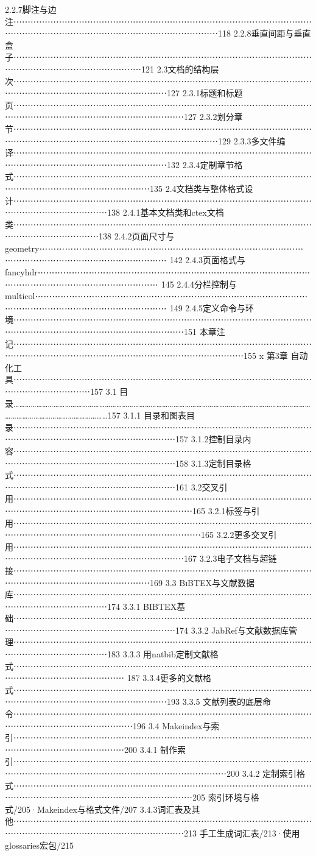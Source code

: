 \documentclass[UTF8]{ctexart}
\begin{document}
2.2.7脚注与边注⋯⋯⋯⋯⋯⋯⋯⋯⋯⋯⋯⋯⋯⋯⋯⋯⋯⋯⋯⋯⋯⋯⋯⋯⋯⋯⋯⋯⋯⋯⋯⋯⋯⋯⋯⋯⋯⋯⋯⋯⋯⋯⋯⋯⋯⋯⋯⋯⋯⋯⋯⋯⋯⋯⋯⋯⋯⋯⋯⋯118
2.2.8垂直间距与垂直盒子⋯⋯⋯⋯⋯⋯⋯⋯⋯⋯⋯⋯⋯⋯⋯⋯⋯⋯⋯⋯⋯⋯⋯⋯⋯⋯⋯⋯⋯⋯⋯⋯⋯⋯⋯⋯⋯⋯⋯⋯⋯⋯⋯⋯⋯⋯⋯⋯⋯⋯⋯121
2.3文档的结构层次⋯⋯⋯⋯⋯⋯⋯⋯⋯⋯⋯⋯⋯⋯⋯⋯⋯⋯⋯⋯⋯⋯⋯⋯⋯⋯⋯⋯⋯⋯⋯⋯⋯⋯⋯⋯⋯⋯⋯⋯⋯⋯⋯⋯⋯⋯⋯⋯⋯⋯⋯⋯⋯⋯127
2.3.1标题和标题页⋯⋯⋯⋯⋯⋯⋯⋯⋯⋯⋯⋯⋯⋯⋯⋯⋯⋯⋯⋯⋯⋯⋯⋯⋯⋯⋯⋯⋯⋯⋯⋯⋯⋯⋯⋯⋯⋯⋯⋯⋯⋯⋯⋯⋯⋯⋯⋯⋯⋯⋯⋯⋯⋯⋯⋯127
2.3.2划分章节⋯⋯⋯⋯⋯⋯⋯⋯⋯⋯⋯⋯⋯⋯⋯⋯⋯⋯⋯⋯⋯⋯⋯⋯⋯⋯⋯⋯⋯⋯⋯⋯⋯⋯⋯⋯⋯⋯⋯⋯⋯⋯⋯⋯⋯⋯⋯⋯⋯⋯⋯⋯⋯⋯⋯⋯⋯⋯⋯⋯129
2.3.3多文件编译⋯⋯⋯⋯⋯⋯⋯⋯⋯⋯⋯⋯⋯⋯⋯⋯⋯⋯⋯⋯⋯⋯⋯⋯⋯⋯⋯⋯⋯⋯⋯⋯⋯⋯⋯⋯⋯⋯⋯⋯⋯⋯⋯⋯⋯⋯⋯⋯⋯⋯⋯⋯⋯⋯132
2.3.4定制章节格式⋯⋯⋯⋯⋯⋯⋯⋯⋯⋯⋯⋯⋯⋯⋯⋯⋯⋯⋯⋯⋯⋯⋯⋯⋯⋯⋯⋯⋯⋯⋯⋯⋯⋯⋯⋯⋯⋯⋯⋯⋯⋯⋯⋯⋯⋯⋯⋯⋯⋯⋯⋯135
2.4文档类与整体格式设计⋯⋯⋯⋯⋯⋯⋯⋯⋯⋯⋯⋯⋯⋯⋯⋯⋯⋯⋯⋯⋯⋯⋯⋯⋯⋯⋯⋯⋯⋯⋯⋯⋯⋯⋯⋯⋯⋯⋯⋯⋯⋯⋯⋯⋯⋯⋯138
2.4.1基本文档类和ctex文档类⋯⋯⋯⋯⋯⋯⋯⋯⋯⋯⋯⋯⋯⋯⋯⋯⋯⋯⋯⋯⋯⋯⋯⋯⋯⋯⋯⋯⋯⋯⋯⋯⋯⋯⋯⋯⋯⋯⋯⋯⋯⋯⋯⋯⋯⋯138
2.4.2页面尺寸与geometry⋯⋯⋯⋯⋯⋯⋯⋯⋯⋯⋯⋯⋯⋯⋯⋯⋯⋯⋯⋯⋯⋯⋯⋯⋯⋯⋯⋯⋯⋯⋯⋯⋯⋯⋯⋯⋯⋯⋯⋯⋯⋯⋯⋯⋯⋯⋯⋯⋯⋯ 142
2.4.3页面格式与fancyhdr⋯⋯⋯⋯⋯⋯⋯⋯⋯⋯⋯⋯⋯⋯⋯⋯⋯⋯⋯⋯⋯⋯⋯⋯⋯⋯⋯⋯⋯⋯⋯⋯⋯⋯⋯⋯⋯⋯⋯⋯⋯⋯⋯⋯⋯⋯⋯⋯⋯⋯ 145
2.4.4分栏控制与multicol⋯⋯⋯⋯⋯⋯⋯⋯⋯⋯⋯⋯⋯⋯⋯⋯⋯⋯⋯⋯⋯⋯⋯⋯⋯⋯⋯⋯⋯⋯⋯⋯⋯⋯⋯⋯⋯⋯⋯⋯⋯⋯⋯⋯⋯⋯⋯⋯⋯⋯⋯ 149
2.4.5定义命令与环境⋯⋯⋯⋯⋯⋯⋯⋯⋯⋯⋯⋯⋯⋯⋯⋯⋯⋯⋯⋯⋯⋯⋯⋯⋯⋯⋯⋯⋯⋯⋯⋯⋯⋯⋯⋯⋯⋯⋯⋯⋯⋯⋯⋯⋯⋯⋯⋯⋯⋯⋯⋯⋯⋯⋯⋯151
本章注记⋯⋯⋯⋯⋯⋯⋯⋯⋯⋯⋯⋯⋯⋯⋯⋯⋯⋯⋯⋯⋯⋯⋯⋯⋯⋯⋯⋯⋯⋯⋯⋯⋯⋯⋯⋯⋯⋯⋯⋯⋯⋯⋯⋯⋯⋯⋯⋯⋯⋯⋯⋯⋯⋯⋯⋯⋯⋯⋯⋯⋯⋯⋯155
x
第3章	自动化工具⋯⋯⋯⋯⋯⋯⋯⋯⋯⋯⋯⋯⋯⋯⋯⋯⋯⋯⋯⋯⋯⋯⋯⋯⋯⋯⋯⋯⋯⋯⋯⋯⋯⋯⋯⋯⋯⋯⋯⋯⋯⋯⋯⋯⋯157
3.1 目录…………………………………………………………………………………………………………………………………………………………………………………………157
3.1.1 目录和图表目录⋯⋯⋯⋯⋯⋯⋯⋯⋯⋯⋯⋯⋯⋯⋯⋯⋯⋯⋯⋯⋯⋯⋯⋯⋯⋯⋯⋯⋯⋯⋯⋯⋯⋯⋯⋯⋯⋯⋯⋯⋯⋯⋯⋯⋯⋯⋯⋯⋯⋯⋯⋯⋯⋯⋯157
3.1.2控制目录内容⋯⋯⋯⋯⋯⋯⋯⋯⋯⋯⋯⋯⋯⋯⋯⋯⋯⋯⋯⋯⋯⋯⋯⋯⋯⋯⋯⋯⋯⋯⋯⋯⋯⋯⋯⋯⋯⋯⋯⋯⋯⋯⋯⋯⋯⋯⋯⋯⋯⋯⋯⋯⋯⋯⋯158
3.1.3定制目录格式⋯⋯⋯⋯⋯⋯⋯⋯⋯⋯⋯⋯⋯⋯⋯⋯⋯⋯⋯⋯⋯⋯⋯⋯⋯⋯⋯⋯⋯⋯⋯⋯⋯⋯⋯⋯⋯⋯⋯⋯⋯⋯⋯⋯⋯⋯⋯⋯⋯⋯⋯⋯⋯⋯⋯161
3.2交叉引用⋯⋯⋯⋯⋯⋯⋯⋯⋯⋯⋯⋯⋯⋯⋯⋯⋯⋯⋯⋯⋯⋯⋯⋯⋯⋯⋯⋯⋯⋯⋯⋯⋯⋯⋯⋯⋯⋯⋯⋯⋯⋯⋯⋯⋯⋯⋯⋯⋯⋯⋯⋯⋯⋯⋯⋯⋯165
3.2.1标签与引用⋯⋯⋯⋯⋯⋯⋯⋯⋯⋯⋯⋯⋯⋯⋯⋯⋯⋯⋯⋯⋯⋯⋯⋯⋯⋯⋯⋯⋯⋯⋯⋯⋯⋯⋯⋯⋯⋯⋯⋯⋯⋯⋯⋯⋯⋯⋯⋯⋯⋯⋯⋯⋯⋯⋯⋯⋯⋯165
3.2.2更多交叉引用⋯⋯⋯⋯⋯⋯⋯⋯⋯⋯⋯⋯⋯⋯⋯⋯⋯⋯⋯⋯⋯⋯⋯⋯⋯⋯⋯⋯⋯⋯⋯⋯⋯⋯⋯⋯⋯⋯⋯⋯⋯⋯⋯⋯⋯⋯⋯⋯⋯⋯⋯⋯⋯⋯⋯⋯167
3.2.3电子文档与超链接⋯⋯⋯⋯⋯⋯⋯⋯⋯⋯⋯⋯⋯⋯⋯⋯⋯⋯⋯⋯⋯⋯⋯⋯⋯⋯⋯⋯⋯⋯⋯⋯⋯⋯⋯⋯⋯⋯⋯⋯⋯⋯⋯⋯⋯⋯⋯⋯⋯⋯⋯⋯169
3.3 BɪBTEX与文献数据库⋯⋯⋯⋯⋯⋯⋯⋯⋯⋯⋯⋯⋯⋯⋯⋯⋯⋯⋯⋯⋯⋯⋯⋯⋯⋯⋯⋯⋯⋯⋯⋯⋯⋯⋯⋯⋯⋯⋯⋯⋯⋯⋯⋯⋯⋯⋯174
3.3.1 BIBTEX基础⋯⋯⋯⋯⋯⋯⋯⋯⋯⋯⋯⋯⋯⋯⋯⋯⋯⋯⋯⋯⋯⋯⋯⋯⋯⋯⋯⋯⋯⋯⋯⋯⋯⋯⋯⋯⋯⋯⋯⋯⋯⋯⋯⋯⋯⋯⋯⋯⋯⋯⋯⋯⋯⋯⋯174
3.3.2 JabRef与文献数据库管理⋯⋯⋯⋯⋯⋯⋯⋯⋯⋯⋯⋯⋯⋯⋯⋯⋯⋯⋯⋯⋯⋯⋯⋯⋯⋯⋯⋯⋯⋯⋯⋯⋯⋯⋯⋯⋯⋯⋯⋯⋯⋯⋯⋯⋯⋯⋯183
3.3.3 用natbib定制文献格式⋯⋯⋯⋯⋯⋯⋯⋯⋯⋯⋯⋯⋯⋯⋯⋯⋯⋯⋯⋯⋯⋯⋯⋯⋯⋯⋯⋯⋯⋯⋯⋯⋯⋯⋯⋯⋯⋯⋯⋯⋯⋯⋯⋯⋯⋯⋯⋯⋯ 187
3.3.4更多的文献格式⋯⋯⋯⋯⋯⋯⋯⋯⋯⋯⋯⋯⋯⋯⋯⋯⋯⋯⋯⋯⋯⋯⋯⋯⋯⋯⋯⋯⋯⋯⋯⋯⋯⋯⋯⋯⋯⋯⋯⋯⋯⋯⋯⋯⋯⋯⋯⋯⋯⋯⋯⋯⋯⋯193
3.3.5 文献列表的底层命令⋯⋯⋯⋯⋯⋯⋯⋯⋯⋯⋯⋯⋯⋯⋯⋯⋯⋯⋯⋯⋯⋯⋯⋯⋯⋯⋯⋯⋯⋯⋯⋯⋯⋯⋯⋯⋯⋯⋯⋯⋯⋯⋯⋯⋯⋯⋯⋯⋯⋯196
3.4 Makeindex与索引⋯⋯⋯⋯⋯⋯⋯⋯⋯⋯⋯⋯⋯⋯⋯⋯⋯⋯⋯⋯⋯⋯⋯⋯⋯⋯⋯⋯⋯⋯⋯⋯⋯⋯⋯⋯⋯⋯⋯⋯⋯⋯⋯⋯⋯⋯⋯⋯⋯200
3.4.1 制作索引⋯⋯⋯⋯⋯⋯⋯⋯⋯⋯⋯⋯⋯⋯⋯⋯⋯⋯⋯⋯⋯⋯⋯⋯⋯⋯⋯⋯⋯⋯⋯⋯⋯⋯⋯⋯⋯⋯⋯⋯⋯⋯⋯⋯⋯⋯⋯⋯⋯⋯⋯⋯⋯⋯⋯⋯⋯⋯⋯⋯⋯200
3.4.2 定制索引格式⋯⋯⋯⋯⋯⋯⋯⋯⋯⋯⋯⋯⋯⋯⋯⋯⋯⋯⋯⋯⋯⋯⋯⋯⋯⋯⋯⋯⋯⋯⋯⋯⋯⋯⋯⋯⋯⋯⋯⋯⋯⋯⋯⋯⋯⋯⋯⋯⋯⋯⋯⋯⋯⋯⋯⋯⋯205
索引环境与格式/205·Makeindex与格式文件/207
3.4.3词汇表及其他⋯⋯⋯⋯⋯⋯⋯⋯⋯⋯⋯⋯⋯⋯⋯⋯⋯⋯⋯⋯⋯⋯⋯⋯⋯⋯⋯⋯⋯⋯⋯⋯⋯⋯⋯⋯⋯⋯⋯⋯⋯⋯⋯⋯⋯⋯⋯⋯⋯⋯⋯⋯⋯⋯⋯⋯213
手工生成词汇表/213·使用glossaries宏包/215
\end{document}
